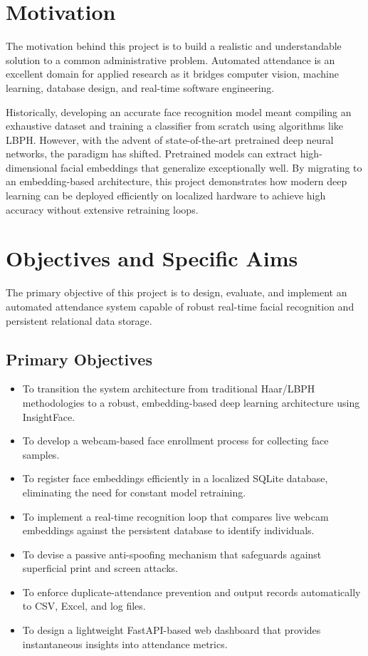 \documentclass[12pt,a4paper]{report}
\newcommand{\JustifiedNormal}{\fontsize{12}{14}\selectfont\justifying\setlength{\parindent}{0pt}}
\begin{document}
\section{Motivation}
\JustifiedNormal
The motivation behind this project is to build a realistic and understandable solution to a common administrative problem. Automated attendance is an excellent domain for applied research as it bridges computer vision, machine learning, database design, and real-time software engineering. 

Historically, developing an accurate face recognition model meant compiling an exhaustive dataset and training a classifier from scratch using algorithms like LBPH. However, with the advent of state-of-the-art pretrained deep neural networks, the paradigm has shifted. Pretrained models can extract high-dimensional facial embeddings that generalize exceptionally well. By migrating to an embedding-based architecture, this project demonstrates how modern deep learning can be deployed efficiently on localized hardware to achieve high accuracy without extensive retraining loops.

\section{Objectives and Specific Aims}
\JustifiedNormal
The primary objective of this project is to design, evaluate, and implement an automated attendance system capable of robust real-time facial recognition and persistent relational data storage.

\subsection{Primary Objectives}
\JustifiedNormal
\begin{itemize}[leftmargin=*]
  \item To transition the system architecture from traditional Haar/LBPH methodologies to a robust, embedding-based deep learning architecture using InsightFace.
  \item To develop a webcam-based face enrollment process for collecting face samples.
  \item To register face embeddings efficiently in a localized SQLite database, eliminating the need for constant model retraining.
  \item To implement a real-time recognition loop that compares live webcam embeddings against the persistent database to identify individuals.
  \item To devise a passive anti-spoofing mechanism that safeguards against superficial print and screen attacks.
  \item To enforce duplicate-attendance prevention and output records automatically to CSV, Excel, and log files.
  \item To design a lightweight FastAPI-based web dashboard that provides instantaneous insights into attendance metrics.
\end{itemize}
\end{document}
